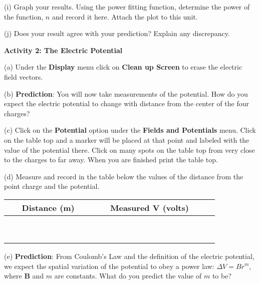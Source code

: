 (i) Graph your results. Using the power fitting
function, determine the power of the function, $n$ and record it here.
Attach the plot to this unit.
\vspace{15mm}

(j) Does your result agree with your prediction? Explain any discrepancy.\vspace{15mm}

\textbf{Activity 2: The Electric Potential}

(a) Under the {\bf Display} menu click on {\bf Clean up Screen} to erase the
electric field vectors.

(b) \textbf{Prediction}: You will now take measurements of the potential.
How do you expect the electric potential to change with distance from the center of the four
charges?
\vspace{15mm}
 
(c) Click on the \textbf{Potential} option under the \textbf{Fields and Potentials}
menu. Click on the table top and a marker will be
placed at that point and labeled with the value of the potential there.
Click on many spots on the table top from very close to the charges to
far away.
When you are finished print the table top.
\vspace{15mm}

(d) Measure and record in the table below the values of the distance from the
point charge and the potential.

\vspace{0.3cm}
{\centering \begin{tabular}{|c|c|c|}
\hline 
~~~Distance (m)~~~&
~~~Measured V (volts)~~~\\
\hline
\hline 
&
\\
\hline 
&
\\
\hline 
&
\\
\hline 
&
\\
\hline 
&
\\
\hline 
&
\\
\hline 
&
\\
\hline 
&
\\
\hline 
&
\\
\hline
\end{tabular}\par}
\vspace{0.3cm}


(e) \textbf{Prediction}: From Coulomb's Law and the definition of the
electric potential, we expect the spatial variation of the potential
to obey a power law: \( \Delta V=Br^{m} \), where \( \mathbf{B} \)
and \( m \) are constants. What do you predict the value of \textbf{\( m \)}
to be?\vspace{15mm}


